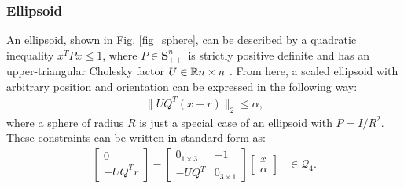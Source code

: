 \subsubsection{Ellipsoid}
An ellipsoid, shown in Fig. \ref{fig_sphere}, can be described by a quadratic inequality $x^TPx \leq 1$, where $P\in \mathbf{S}^n_{++}$ is strictly positive definite and has an upper-triangular Cholesky factor $U \in \mathbb{R}{n \times n}$ \cite{boyd2004}. From here, a scaled ellipsoid with arbitrary position and orientation can be expressed in the following way:
\begin{align}
    \|U Q^T (x - r)\|_2 \leq \alpha,
\end{align}
where a sphere of radius $R$ is just a special case of an ellipsoid with $P = I/R^2$. These constraints can be written in standard form as:
\begin{align}
   \begin{bmatrix} 0 \\ -UQ^Tr \end{bmatrix} - \begin{bmatrix} 0_{1 \times 3} & -1 \\ -UQ^T & 0_{3 \times 1} \end{bmatrix} \begin{bmatrix} x \\ \alpha \end{bmatrix} &\in \mathcal{Q}_4 .
\end{align}
